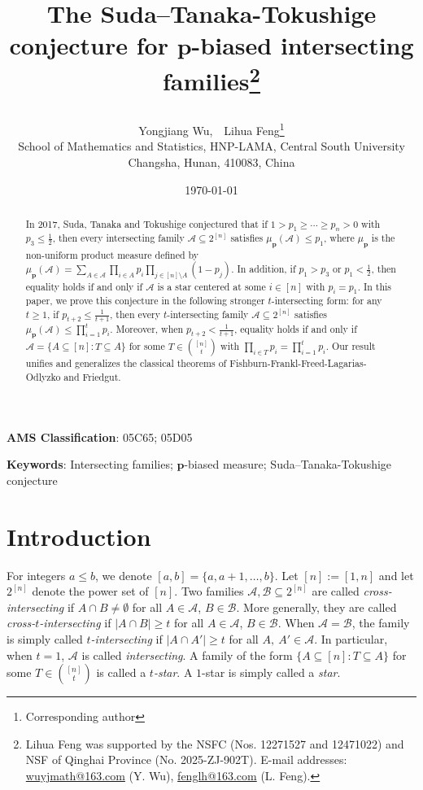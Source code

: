 \documentclass[11pt]{article}
\title{\bf \Large }
\date{\today }
\title{{\bf \Large 
The Suda–Tanaka-Tokushige conjecture for $\mathbf{p}$-biased  intersecting families}\footnote{ Lihua Feng was supported by the NSFC (Nos. 12271527 and 12471022) and NSF of Qinghai Province (No. 2025-ZJ-902T). E-mail addresses: \url{wuyjmath@163.com} (Y. Wu), \url{fenglh@163.com} (L. Feng). }
\author{
{\small  Yongjiang Wu,\ \ Lihua Feng\footnote{Corresponding author}
}\\[2mm]
\small School of Mathematics and Statistics, HNP-LAMA, Central South University\\
 \small Changsha, Hunan, 410083, China\\ 
}}
\begin{document}
\maketitle
\begin{abstract}  
In 2017, Suda, Tanaka and Tokushige conjectured that if $1>p_1\ge\cdots\ge p_n>0$ with $p_3\le \frac{1}{2}$, then every intersecting family $\mathcal A\subseteq 2^{[n]}$ satisfies $\mu_{\mathbf{p}}(\mathcal A)\le p_1$, where $\mu_{\mathbf{p}}$ is the non-uniform product measure defined by $\mu_{\mathbf{p}}(\mathcal{A})=\sum_{A\in\mathcal{A}} \prod_{i\in A} p_i \prod_{j\in [n]\setminus A}(1-p_j)$. In addition, if $p_1 > p_3$ or $p_1 < \frac{1}{2}$, then equality holds if and only if $\mathcal{A}$ is a  star centered at some $i \in [n]$ with $p_i = p_1$.
In this paper, we prove this conjecture in the following stronger $t$-intersecting form: for any $t\ge 1$, if $p_{t+2}\le \frac{1}{t+1}$, then  every $t$-intersecting family $\mathcal{A} \subseteq 2^{[n]}$ satisfies 
 $\mu_{\mathbf{p}}(\mathcal A)\le \prod_{i=1}^t p_i$. Moreover,  when $p_{t+2}<\frac{1}{t+1}$, equality holds if and only if  $\mathcal{A}=\{A\subseteq [n]: T\subseteq A\}$ for some $T\in \binom{[n]}{t}$ with $\prod_{i\in T} p_i=\prod_{i=1}^t p_i$. Our result unifies and generalizes the classical theorems of
Fishburn-Frankl-Freed-Lagarias-Odlyzko and Friedgut.
\end{abstract}

{\bf AMS Classification}:  05C65; 05D05 

{\bf Keywords}: Intersecting families; $\mathbf{p}$-biased measure; Suda–Tanaka-Tokushige conjecture

\section{Introduction}
For integers $a \leq b$, we denote $[a,b]=\{a,a+1,\dots,b\}$. Let $[n]:=[1,n]$ and let $2^{[n]}$ denote the power set of $[n]$. Two families $\mathcal{A},\mathcal{B}\subseteq 2^{[n]}$ are called \textit{cross-intersecting} if $A\cap B\neq\emptyset$ for all $A\in\mathcal{A}$, $B\in\mathcal{B}$. More generally, they are called \textit{cross-$t$-intersecting} if $|A\cap B|\ge t$ for all $A\in\mathcal{A}$, $B\in\mathcal{B}$. When $\mathcal{A}=\mathcal{B}$, the family is simply called \textit{$t$-intersecting} if $|A\cap A'|\ge t$ for all $A,\ A'\in\mathcal{A}$. In particular, when $t=1$, $\mathcal{A}$ is called \textit{intersecting}. A family of the form $\{A\subseteq[n]:T\subseteq A\}$ for some $T\in\binom{[n]}{t}$ is called a \textit{$t$-star}.  A $1$-star is simply called a \textit{star}.
\end{document}
